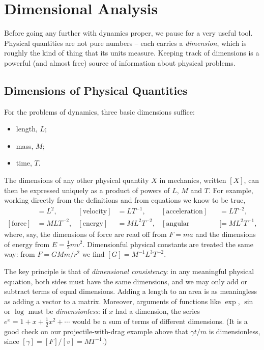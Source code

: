 \section{Dimensional Analysis}

Before going any further with dynamics proper, we pause for a very useful tool. Physical quantities are not pure numbers -- each carries a \emph{dimension}, which is roughly the kind of thing that its units measure. Keeping track of dimensions is a powerful (and almost free) source of information about physical problems.

\subsection{Dimensions of Physical Quantities}

For the problems of dynamics, three basic dimensions suffice:
\begin{itemize}
	\item length, $L$;
	\item mass, $M$;
	\item time, $T$.
\end{itemize}
The dimensions of any other physical quantity $X$ in mechanics, written $[X]$, can then be expressed uniquely as a product of powers of $L$, $M$ and $T$. For example, working directly from the definitions and from equations we know to be true,
\begin{align*}
	[\text{area}] &= L^2, & [\text{velocity}] &= LT^{-1}, & [\text{acceleration}] &= LT^{-2}, \\
	[\text{force}] &= MLT^{-2}, & [\text{energy}] &= ML^2T^{-2}, & [\text{angular momentum}] &= ML^2 T^{-1},
\end{align*}
where, say, the dimensions of force are read off from $F = ma$ and the dimensions of energy from $E = \frac{1}{2}mv^2$. Dimensionful physical constants are treated the same way: from $F = GMm/r^2$ we find $[G] = M^{-1}L^3T^{-2}$.

The key principle is that of \emph{dimensional consistency}: in any meaningful physical equation, both sides must have the same dimensions, and we may only add or subtract terms of equal dimensions. Adding a length to an area is as meaningless as adding a vector to a matrix. Moreover, arguments of functions like $\exp$, $\sin$ or $\log$ must be \emph{dimensionless}: if $x$ had a dimension, the series $e^x = 1 + x + \frac{1}{2}x^2 + \cdots$ would be a sum of terms of different dimensions. (It is a good check on our projectile-with-drag example above that $\gamma t/m$ is dimensionless, since $[\gamma] = [F]/[v] = MT^{-1}$.)

